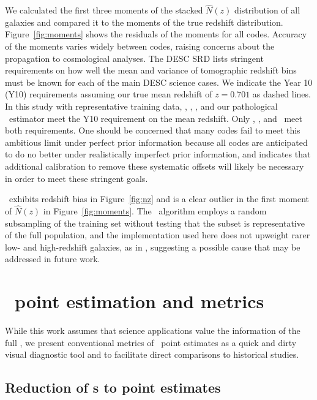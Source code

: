 We calculated the first three moments of the stacked $\hat{N}(z)$ distribution of all galaxies and compared it to the moments of the true redshift distribution.  Figure~\ref{fig:moments} shows the residuals of the moments for all codes.  Accuracy of the moments varies widely between codes, raising concerns about the propagation to cosmological analyses.  The DESC SRD \citep{Mandelbaum:2018} lists stringent requirements on how well the mean and variance of tomographic redshift bins must be known for each of the main DESC science cases.  We indicate the Year 10 (Y10) requirements assuming our true mean redshift of $z=0.701$ as dashed lines.  In this study with representative training data, \annz, \cmnn, \tpz, and our pathological \trainz\ estimator meet the Y10 requirement on the mean redshift.  Only \annz, \cmnn, and \trainz\ meet both requirements.  One should be concerned that many codes fail to meet this ambitious limit under perfect prior information because all codes are anticipated to do no better under realistically imperfect prior information, and indicates that additional calibration to remove these systematic offsets \citep[e.~g.~][]{Newman:2008} will likely be necessary in order to meet these stringent goals.


\skynet\ exhibits redshift bias in Figure~\ref{fig:nz} and is a clear outlier in the first moment of $\hat{N}(z)$ in Figure~\ref{fig:moments}.
The \skynet\ algorithm employs a random subsampling of the training set without testing that the subset is representative of the full population, and the implementation used here does not upweight rarer low- and high-redshift galaxies, as in \citet{Bonnett:15}, suggesting a possible cause that may be addressed in future work.

\section{\Pz\ point estimation and metrics}
\label{sec:pointmetrics}

While this work assumes that science applications value the information of the full \pzpdf, we present conventional metrics of \pz\ point estimates as a quick and dirty visual diagnostic tool and to facilitate direct comparisons to historical studies.

\subsection{Reduction of \pzpdf s to point estimates}
\label{sec:pointest}

